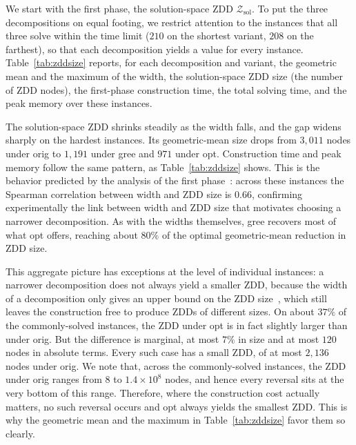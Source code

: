\documentclass[conference]{IEEEtran}
\newcommand{\zsol}{\mathcal{Z}_{\mathrm{sol}}}
\newcommand{\OrigDecom}{\textsf{orig}\xspace}
\newcommand{\HeurDecom}{\textsf{gree}\xspace}
\newcommand{\OptDecom}{\textsf{opt}\xspace}
\begin{document}
We start with the first phase, the solution-space ZDD $\zsol$. To put the three
decompositions on equal footing, we restrict attention to the instances that all
three solve within the time limit ($210$ on the shortest variant, $208$ on the
farthest), so that each decomposition yields a value for every instance.
Table~\ref{tab:zddsize} reports, for each decomposition and variant, the geometric
mean and the maximum of the width, the solution-space ZDD size (the number of ZDD nodes), the first-phase
construction time, the total solving time, and the peak memory over these
instances.

The solution-space ZDD shrinks steadily as the width falls, and the gap widens
sharply on the hardest instances. Its geometric-mean size drops from $3{,}011$
nodes under \OrigDecom to $1{,}191$ under \HeurDecom and $971$ under \OptDecom.
Construction time and peak memory follow the same pattern, as
Table~\ref{tab:zddsize} shows. This is the behavior predicted by the analysis of
the first phase~\cite{inoue16}: across these instances the Spearman correlation
between width and ZDD size is $0.66$, confirming experimentally the link between
width and ZDD size that motivates choosing a narrower decomposition. 
As with the widths themselves,
\HeurDecom recovers most of what \OptDecom offers, reaching about $80\%$ of the
optimal geometric-mean reduction in ZDD size.

This aggregate picture has exceptions at the level of individual instances: a
narrower decomposition does not always yield a smaller ZDD, because the width of a
decomposition only gives an upper bound on the ZDD size~\cite{inoue16}, which still
leaves the construction free to produce ZDDs of different sizes. On about $37\%$ of
the commonly-solved instances, the ZDD under \OptDecom is in fact slightly larger
than under \OrigDecom. But the difference is marginal, at most $7\%$ in size and at
most $120$ nodes in absolute terms.
Every such case has a small ZDD, of at most
$2{,}136$ nodes under \OrigDecom. 
We note that, across the commonly-solved instances, the ZDD under
\OrigDecom ranges from $8$ to $1.4\times10^{8}$ nodes, and hence every reversal sits at the
very bottom of this range. 
Therefore, where the construction cost actually matters, no such
reversal occurs and \OptDecom always yields the smallest ZDD. 
This is why the geometric mean and the maximum in Table~\ref{tab:zddsize} favor them so clearly.
\end{document}
